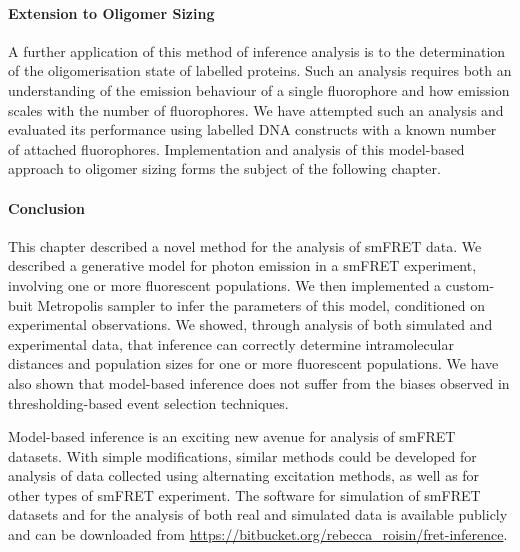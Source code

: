 \paragraph{Extension to Oligomer Sizing}
A further application of this method of inference analysis is to the determination of the oligomerisation state of labelled proteins. Such an analysis requires both an understanding of the emission behaviour of a single fluorophore and how emission scales with the number of fluorophores. We have attempted such an analysis and evaluated its performance using labelled DNA constructs with a known number of attached fluorophores. Implementation and analysis of this model-based approach to oligomer sizing forms the subject of the following chapter.

\paragraph{Conclusion}
This chapter described a novel method for the analysis of smFRET data. We described a generative model for photon emission in a smFRET experiment, involving one or more fluorescent populations. We then implemented a custom-buit Metropolis sampler to infer the parameters of this model, conditioned on experimental observations. We showed, through analysis of both simulated and experimental data, that inference can correctly determine intramolecular distances and population sizes for one or more fluorescent populations. We have also shown that model-based inference does not suffer from the biases observed in thresholding-based event selection techniques.  

Model-based inference is an exciting new avenue for analysis of smFRET datasets. With simple modifications, similar methods could be developed for analysis of data collected using alternating excitation methods, as well as for other types of smFRET experiment. The software for simulation of smFRET datasets and for the analysis of both real and simulated data is available publicly and can be downloaded from \url{https://bitbucket.org/rebecca_roisin/fret-inference}. 
